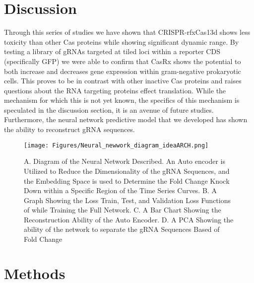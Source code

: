 \documentclass[times]{zHenriquesLab-StyleBioRxiv}
\begin{document}
\section*{Discussion}
Through this series of studies we have shown that CRISPR-rfxCas13d shows less toxicity than other Cas proteins while showing significant dynamic range. By testing a library of gRNAs targeted at tiled loci within a reporter CDS (specifically GFP) we were able to confirm that CasRx shows the potential to both increase and decreases gene expression within gram-negative prokaryotic cells. This proves to be in contrast with other inactive Cas proteins and raises questions about the RNA targeting proteins effect translation. While the mechanism for which this is not yet known, the specifics of this mechanism is speculated in the discussion section, it is an avenue of future studies. Furthermore, the neural network predictive model that we developed has shown the ability to reconstruct gRNA sequences.

\begin{figure*}[ht]
    \centering  
    \texttt{[image: Figures/Neural\_newwork\_diagram\_ideaARCH.png]}
    \caption{A. Diagram of the Neural Network Described. An Auto encoder is Utilized to Reduce the Dimensionality of the gRNA Sequences, and the Embedding Space is used to Determine the Fold Change Knock Down within a Specific Region of the Time Series Curves. B. A Graph Showing the Loss Train, Test, and Validation Loss Functions of while Training the Full Network. C. A Bar Chart Showing the Reconstruction Ability of the Auto Encoder. D. A PCA Showing the ability of the network to separate the gRNA Sequences Based of Fold Change}
    \label{fig:2}
\end{figure*}

\section*{Methods} 
\end{document}
